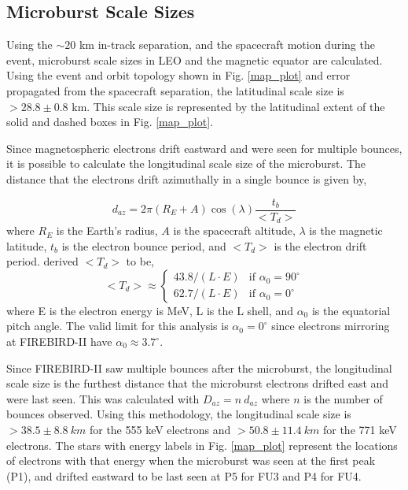 \documentclass[draft,linenumbers]{agujournal}
\begin{document}
\subsection{Microburst Scale Sizes} \label{scale_size} %
Using the $\sim 20$ km in-track separation, and the spacecraft motion during the event, microburst scale sizes in LEO and the magnetic equator are calculated. Using the event and orbit topology shown in Fig. \ref{map_plot} and error propagated from the spacecraft separation, the latitudinal scale size is $ > 28.8 \pm 0.8$ km. This scale size is represented by the latitudinal extent of the solid and dashed boxes in Fig. \ref{map_plot}.

Since magnetospheric electrons drift eastward and were seen for multiple bounces, it is possible to calculate the longitudinal scale size of the microburst. The distance that the electrons drift azimuthally in a single bounce is given by, 

\begin{equation}
d_{az} = 2 \pi (R_E + A) \cos(\lambda) \frac{t_b}{<T_{d}>}
\label{bounce_drift}
\end{equation} where $R_E$ is the Earth's radius, $A$ is the spacecraft altitude, $\lambda$ is the magnetic latitude, $t_b$ is the electron bounce period, and $<T_{d}>$ is the electron drift period. \citet{Parks03} derived $<T_{d}>$ to be,
\begin{equation}
<T_{d}> \approx
\begin{cases}
43.8 /(L \cdot E) & \text{if } \alpha_0 = 90^{\circ} \\    62.7/(L \cdot E) & \text{if } \alpha_0 = 0^{\circ}
\end{cases}
\label{drift}
\end{equation} where E is the electron energy is MeV, L is the L shell, and $\alpha_0$ is the equatorial pitch angle. The valid limit for this analysis is $\alpha_0 = 0^{\circ}$ since electrons mirroring at FIREBIRD-II have $\alpha_0 \approx 3.7^{\circ}$. 

Since FIREBIRD-II saw multiple bounces after the microburst, the longitudinal scale size is the furthest distance that the microburst electrons drifted east and were last seen. This was calculated with $D_{az} = n \ d_{az}$ where $n$ is the number of bounces observed. Using this methodology, the longitudinal scale size is $ > 38.5 \pm 8.8 \ km$ for the 555 keV electrons and $ > 50.8 \pm 11.4 \ km$ for the 771 keV electrons. The stars with energy labels in Fig. \ref{map_plot} represent the locations of electrons with that energy when the microburst was seen at the first peak (P1), and drifted eastward to be last seen at P5 for FU3 and P4 for FU4.
\end{document}

